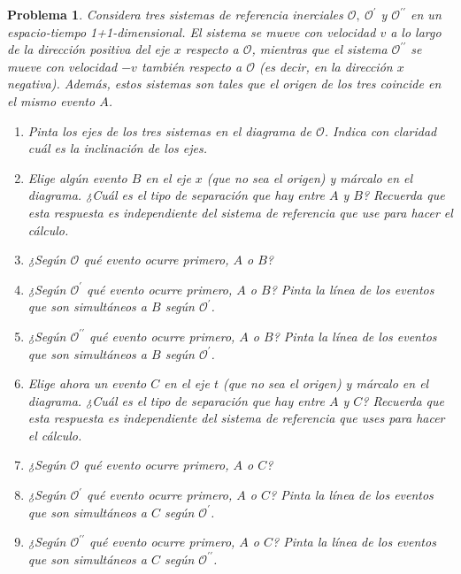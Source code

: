 \documentclass[12pt]{article}
\theoremstyle{break}
\newtheorem{exercise}{Problema}
\theoremstyle{nonumberbreak}
\newcommand*{\observer}{\mathcal{O}}
\newcommand*{\primeobserver}{\mathcal{O}^{\prime}}
\newcommand*{\biprimeobserver}{\mathcal{O}^{\prime\prime}}
\begin{document}
    \begin{exercise}
        Considera tres sistemas de referencia inerciales \(\observer,\ \primeobserver\) y \(\biprimeobserver\) en un espacio-tiempo 1+1-dimensional. El sistema se mueve con velocidad \(v\) a lo largo de la dirección positiva del eje \(x\) respecto a \(\observer\), mientras que el sistema \(\biprimeobserver\) se mueve con velocidad \(-v\) también respecto a \(\observer\) (es decir, en la dirección \(x\) negativa). Además, estos sistemas son tales que el origen de los tres coincide en el mismo evento \(A\).

        \begin{enumerate}[label = \alph*)]
            \item Pinta los ejes de los tres sistemas en el diagrama de \(\observer\). Indica con claridad cuál es la inclinación de los ejes.
            \item Elige algún evento \(B\) en el eje \(x\) (que no sea el origen) y márcalo en el diagrama. ¿Cuál es el tipo de separación que hay entre \(A\) y \(B\)? Recuerda que esta respuesta es independiente del sistema de referencia que use para hacer el cálculo.
            \item ¿Según \(\observer\) qué evento ocurre primero, \(A\) o \(B\)?
            \item ¿Según \(\primeobserver\) qué evento ocurre primero, \(A\) o \(B\)? Pinta la línea de los eventos que son simultáneos a \(B\) según \(\primeobserver\).
            \item ¿Según \(\biprimeobserver\) qué evento ocurre primero, \(A\) o \(B\)? Pinta la línea de los eventos que son simultáneos a \(B\) según \(\primeobserver\).
            \item Elige ahora un evento \(C\) en el eje \(t\) (que no sea el origen) y márcalo en el diagrama. ¿Cuál es el tipo de separación que hay entre \(A\) y \(C\)? Recuerda que esta respuesta es independiente del sistema de referencia que uses para hacer el cálculo.
            \item ¿Según \(\observer\) qué evento ocurre primero, \(A\) o \(C\)?
            \item ¿Según \(\primeobserver\) qué evento ocurre primero, \(A\) o \(C\)? Pinta la línea de los eventos que son simultáneos a \(C\) según \(\primeobserver\).
            \item ¿Según \(\biprimeobserver\) qué evento ocurre primero, \(A\) o \(C\)? Pinta la línea de los eventos que son simultáneos a \(C\) según \(\biprimeobserver\).
        \end{enumerate}
    \end{exercise}
\end{document}
